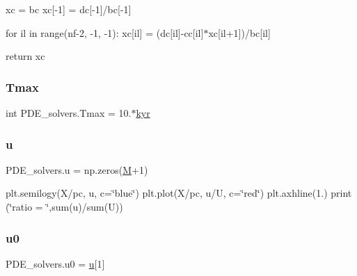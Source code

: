 xc = bc xc\mbox{[}-\/1\mbox{]} = dc\mbox{[}-\/1\mbox{]}/bc\mbox{[}-\/1\mbox{]}

for il in range(nf-\/2, -\/1, -\/1)\+: xc\mbox{[}il\mbox{]} = (dc\mbox{[}il\mbox{]}-\/cc\mbox{[}il\mbox{]}$\ast$xc\mbox{[}il+1\mbox{]})/bc\mbox{[}il\mbox{]}

return xc \mbox{\label{namespacePDE__solvers_acdfd09d09c00385a3f3574d55d7e54a9}} 
\subsubsection{\texorpdfstring{Tmax}{Tmax}}
{\footnotesize\ttfamily int P\+D\+E\+\_\+solvers.\+Tmax = 10.$\ast$\hyperlink{namespacePDE__solvers_a17e611d575d9a8bda46ea6b596138f12}{kyr}}

\mbox{\label{namespacePDE__solvers_abaa9fdf113a88661fc0afa93032755d3}} 
\subsubsection{\texorpdfstring{u}{u}}
{\footnotesize\ttfamily P\+D\+E\+\_\+solvers.\+u = np.\+zeros(\hyperlink{namespacePDE__solvers_a9d6fca7c2abdff4c2c7feec55d437940}{M}+1)}



plt.\+semilogy(X/pc, u, c=\char`\"{}blue\char`\"{}) plt.\+plot(X/pc, u/U, c=\char`\"{}red\char`\"{}) plt.\+axhline(1.) print (\char`\"{}ratio = \char`\"{},sum(u)/sum(U)) 

\mbox{\label{namespacePDE__solvers_aecb3894d7f844fe950ec6e4eb6ab14c6}} 
\subsubsection{\texorpdfstring{u0}{u0}}
{\footnotesize\ttfamily P\+D\+E\+\_\+solvers.\+u0 = \hyperlink{namespacePDE__solvers_abaa9fdf113a88661fc0afa93032755d3}{u}\mbox{[}1\mbox{]}}

\mbox{\label{namespacePDE__solvers_a841654a1a841e1aca6f253e271b158c8}} 
